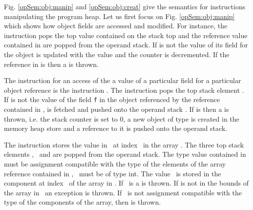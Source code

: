 \begin{figure}[ht!]
\end{figure}
\clearpage

Fig. \ref{opSem:obj:manip} and \ref{opSem:obj:creat}  give the semantics for instructions manipulating the program heap.
Let us first focus on Fig. \ref{opSem:obj:manip} which shows how object fields are accessed and modified.  
For instance, the instruction \putfield{} pops the top value contained on the stack top \stackOnlyParam{\counterOnly} 
and the reference value contained in  
	are popped from the operand stack. If  is not \Mynull{} 
the value of its field 	\fieldd{} for the object  is updated with the value\stackOnlyParam{\counterOnly} and
 the counter \counterOnly{} is decremented. If the reference in  is \Mynull{} then a \NullPointerExc{} is thrown. 

The instruction for an access of the a value of a particular field for a particular object reference is the 
instruction \getfield. The instruction pops the  
 top stack element \stackOnlyParam{\counterOnly}.
 If \stackOnlyParam{\counterOnly} is not \Mynull{} the value of the field \texttt{f}
in the object referenced by the reference contained in \stackOnlyParam{\counterOnly}, is fetched and pushed onto the operand stack \stackOnlyParam{\counterOnly}.
If \stackOnlyParam{\counterOnly} is \Mynull{} then a \NullPointerExc{} is thrown, i.e. the stack counter is set to 0, a new object of type
\NullPointerExc{} is created in the memory heap store \heap{} and a reference to it is pushed onto the operand stack.

The instruction \arrstore{} stores the value in \stackOnlyParam{\counterOnly} \ at index  \ in 
 the array  . 
The three top stack elements \stackOnlyParam{\counterOnly},  \  and  
are popped from the operand stack. The type value contained in \stackOnlyParam{\counterOnly} must be assignment 
compatible with the type
of the elements of the array reference contained in ,   \  must be of type int. 
The value \stackOnlyParam{\counterOnly} \ is stored in the component at index  \  of the array  in  .
If  \ is \Mynull{} a \NullPointerExc{} is thrown. If    is not in the bounds of the array 
in   \ an \ArrIndexOutOfBoundExc{} exception is thrown. If \stackOnlyParam{\counterOnly} \ is not assignment 
compatible with the type of the components of the array, then \ArrStoreExc{}  is thrown.

